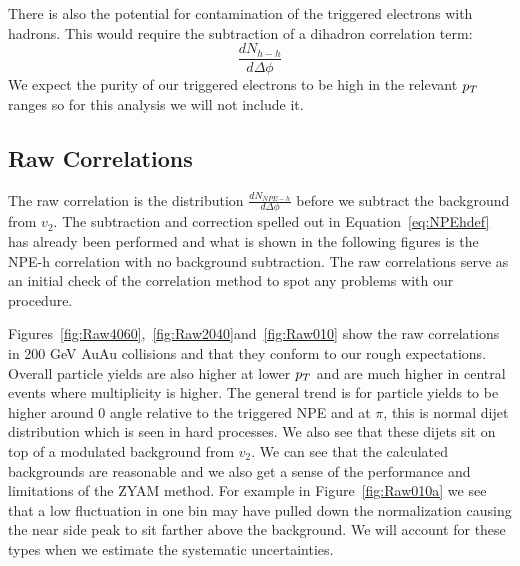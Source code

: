 There is also the potential for contamination of the triggered electrons with hadrons. This would require the subtraction of a dihadron correlation term: \[\frac{dN_{h-h}}{d\Delta\phi}\] We expect the purity of our triggered electrons to be high in the relevant $p_{T}$ ranges so for this analysis we will not include it. 

\subsection{Raw Correlations}

The raw correlation is the distribution $\frac{dN_{NPE-h}}{d\Delta\phi}$ before we subtract the background from $v_2$. The subtraction and correction spelled out in Equation~\ref{eq:NPEhdef} has already been performed and what is shown in the following figures is the NPE-h correlation with no background subtraction. The raw correlations serve as an initial check of the correlation method to spot any problems with our procedure. 

Figures~\ref{fig:Raw4060},~\ref{fig:Raw2040}and~\ref{fig:Raw010} show the raw correlations in 200 GeV AuAu collisions and that they conform to our rough expectations. Overall particle yields are also higher at lower $p_{T}$ and are much higher in central events where multiplicity is higher. The general trend is for particle yields to be higher around 0 angle relative to the triggered NPE and at $\pi$, this is normal dijet distribution which is seen in hard processes. We also see that these dijets sit on top of a modulated background from $v_2$. We can see that the calculated backgrounds are reasonable and we also get a sense of the performance and limitations of the ZYAM method. For example in Figure~\ref{fig:Raw010a} we see that a low fluctuation in one bin may have pulled down the normalization causing the near side peak to sit farther above the background. We will account for these types when we estimate the systematic uncertainties.

